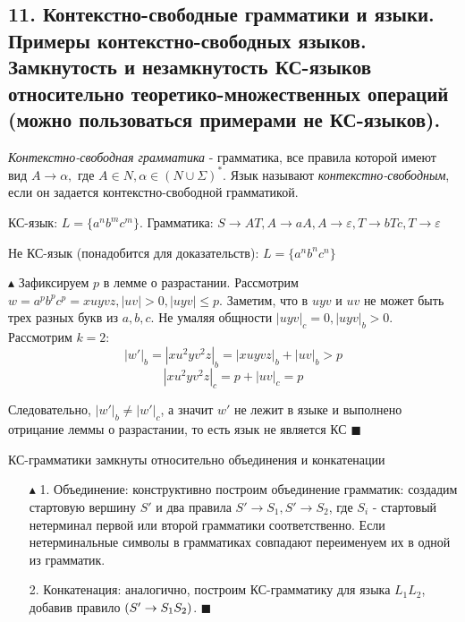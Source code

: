 \subsection{11. Контекстно-свободные грамматики и языки. Примеры контекстно-свободных языков. Замкнутость и незамкнутость КС-языков относительно теоретико-множественных операций (можно пользоваться примерами не КС-языков).}

\par \Def \textit{Контекстно-свободная грамматика} - грамматика, все правила которой имеют вид $A \rightarrow \alpha,$
где $A \in N, \alpha \in (N \cup \Sigma)^*$. Язык называют \textit{контекстно-свободным}, если он задается контекстно-свободной грамматикой.

\par \Example КС-язык: $L = \{a^nb^mc^m\}$. Грамматика: $S \rightarrow AT, A \rightarrow aA, A \rightarrow \varepsilon, T \rightarrow bTc, T \rightarrow \varepsilon$
\par \Example Не КС-язык (понадобится для доказательств): $L=\{a^n b^n c^n\}$
\par $\blacktriangle$ Зафиксируем $p$ в лемме о разрастании. Рассмотрим $w=a^p b^p c^p=xuyvz, |uv|>0, |uyv|\leq p$. Заметим, что в $uyv$ и $uv$ не может быть трех разных букв из $a,b,c$. Не умаляя общности $|uyv|_c=0, |uyv|_b>0$. Рассмотрим $k=2$: $$|w'|_b=|xu^2yv^2z|_b=|xuyvz|_b+|uv|_b>p$$ $$|xu^2yv^2z|_c=p+|uv|_c=p$$
\par Следовательно, $|w'|_b \neq |w'|_c$, а значит $w'$ не лежит в языке и выполнено отрицание леммы о разрастании, то есть язык не является КС $\blacksquare$
\par \Statement КС-грамматики замкнуты относительно объединения и конкатенации
\par \begin{itemize}
    \item[$\blacktriangle$ 1.] Объединение: конструктивно построим объединение грамматик: создадим стартовую вершину $S'$ и два правила $S' \rightarrow S_1, S' \rightarrow S_2$, где $S_i$ - стартовый нетерминал первой или второй грамматики соответственно. Если нетерминальные символы в грамматиках совпадают переименуем их в одной из грамматик.
    \item[2.] Конкатенация: аналогично, построим КС-грамматику для языка $L_1 L_2$, добавив правило $\left({S' \rightarrow S_1 S_2}\right)$. $\blacksquare$
\end{itemize}

